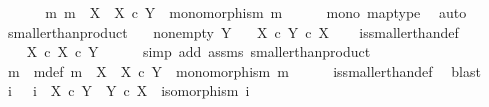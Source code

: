 \begin{isabellebody}
\ \ \isamarkupfalse%
\isanewline
\ \ \isamarkupfalse%
\ {\isachardoublequoteopen}{\isasymexists}m{\isachardot}{\kern0pt}\ m\ {\isacharcolon}{\kern0pt}\ X\ {\isasymrightarrow}\ X\ {\isasymtimes}\isactrlsub c\ Y\ {\isasymand}\ monomorphism\ m{\isachardoublequoteclose}\isanewline
\ \ \ \ \isamarkupfalse%
\ mono\ map{\isacharunderscore}{\kern0pt}type\ \isamarkupfalse%
\ auto\isanewline
{}\isamarkupfalse%
%
\endisatagproof
{\isafoldproof}%
%
\isadelimproof
\isanewline
%
\endisadelimproof
\isanewline
{}\isamarkupfalse%
\ smaller{\isacharunderscore}{\kern0pt}than{\isacharunderscore}{\kern0pt}product{}{\isacharcolon}{\kern0pt}\isanewline
\ \ \ {\isachardoublequoteopen}nonempty\ Y{\isachardoublequoteclose}\isanewline
\ \ \ {\isachardoublequoteopen}X\ {\isasymle}\isactrlsub c\ Y\ {\isasymtimes}\isactrlsub c\ X{\isachardoublequoteclose}\isanewline
%
\isadelimproof
\ \ %
\endisadelimproof
%
\isatagproof
{}\isamarkupfalse%
\ is{\isacharunderscore}{\kern0pt}smaller{\isacharunderscore}{\kern0pt}than{\isacharunderscore}{\kern0pt}def\ \ \isanewline
{}\isamarkupfalse%
\ {\isacharminus}{\kern0pt}\ \isanewline
\ \ \isamarkupfalse%
\ {\isachardoublequoteopen}X\ {\isasymle}\isactrlsub c\ X\ {\isasymtimes}\isactrlsub c\ Y{\isachardoublequoteclose}\isanewline
\ \ \ \ \isamarkupfalse%
\ {\isacharparenleft}{\kern0pt}simp\ add{\isacharcolon}{\kern0pt}\ assms\ smaller{\isacharunderscore}{\kern0pt}than{\isacharunderscore}{\kern0pt}product{}{\isacharparenright}{\kern0pt}\isanewline
\ \ \isamarkupfalse%
\ \isamarkupfalse%
\ m\ \ m{\isacharunderscore}{\kern0pt}def{\isacharcolon}{\kern0pt}\ {\isachardoublequoteopen}m\ {\isacharcolon}{\kern0pt}\ X\ {\isasymrightarrow}\ X\ {\isasymtimes}\isactrlsub c\ Y\ {\isasymand}\ monomorphism\ m{\isachardoublequoteclose}\isanewline
\ \ \ \ \isamarkupfalse%
\ is{\isacharunderscore}{\kern0pt}smaller{\isacharunderscore}{\kern0pt}than{\isacharunderscore}{\kern0pt}def\ \isamarkupfalse%
\ blast\isanewline
\ \ \isamarkupfalse%
\ i\ \ \ {\isachardoublequoteopen}i\ {\isacharcolon}{\kern0pt}\ {\isacharparenleft}{\kern0pt}X\ {\isasymtimes}\isactrlsub c\ Y{\isacharparenright}{\kern0pt}\ {\isasymrightarrow}\ {\isacharparenleft}{\kern0pt}Y\ {\isasymtimes}\isactrlsub c\ X{\isacharparenright}{\kern0pt}\ {\isasymand}\ isomorphism\ i{\isachardoublequoteclose}\isanewline

\end{isabellebody}
